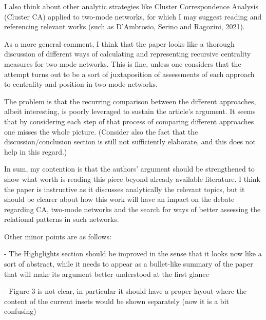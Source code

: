 \documentclass[]{letter}
\begin{document}
I also think about other analytic strategies like Cluster Correspondence Analysis (Cluster CA) applied to two-mode networks, for which I may suggest reading and referencing relevant works (such as D'Ambrosio, Serino and Ragozini, 2021).

As a more general comment, I think that the paper looks like a thorough discussion of different ways of calculating and representing recursive centrality measures for two-mode networks. This is fine, unless one considers that the attempt turns out to be a sort of juxtaposition of assessments of each approach to centrality and position in two-mode networks.

The problem is that the recurring comparison between the different approaches, albeit interesting, is poorly leveraged to sustain the article's argument. It seems that by considering each step of that process of comparing different approaches one misses the whole picture. (Consider also the fact that the discussion/conclusion section is still not sufficiently elaborate, and this does not help in this regard.)

In sum, my contention is that the authors' argument should be strengthened to show what worth is reading this piece beyond already available literature. I think the paper is instructive as it discusses analytically the relevant topics, but it should be clearer about how this work will have an impact on the debate regarding CA, two-mode networks and the search for ways of better assessing the relational patterns in such networks.

Other minor points are as follows:

- The Highglights section should be improved in the sense that it looks now like a sort of abstract, while it needs to appear as a bullet-like summary of the paper that will make its argument better understood at the first glance

- Figure 3 is not clear, in particular it should have a proper layout where the content of the current insets would be shown separately (now it is a bit confusing)
\end{document}
